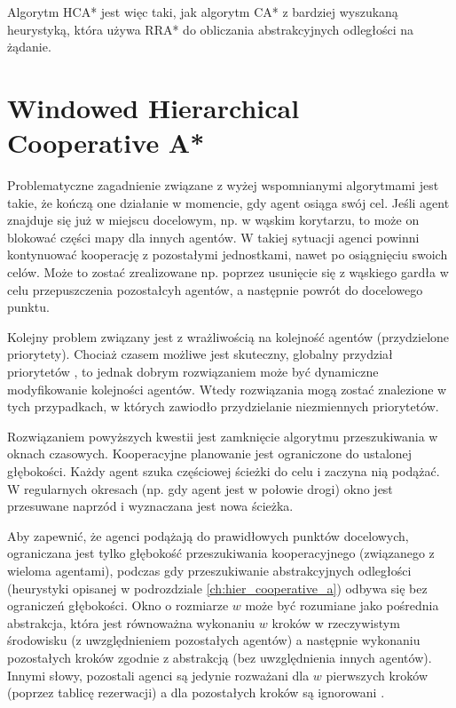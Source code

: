 Algorytm HCA* jest więc taki, jak algorytm CA* z bardziej wyszukaną heurystyką, która używa RRA* do obliczania abstrakcyjnych odległości na żądanie.

\section{Windowed Hierarchical Cooperative A*}
\label{ch:whca}
Problematyczne zagadnienie związane z wyżej wspomnianymi algorytmami jest takie, że kończą one działanie w momencie, gdy agent osiąga swój cel. Jeśli agent znajduje się już w miejscu docelowym, np. w wąskim korytarzu, to może on blokować części mapy dla innych agentów. W takiej sytuacji agenci powinni kontynuować kooperację z pozostałymi jednostkami, nawet po osiągnięciu swoich celów. Może to zostać zrealizowane np. poprzez usunięcie się z wąskiego gardła w celu przepuszczenia pozostałcyh agentów, a następnie powrót do docelowego punktu. \cite{cooppath}

Kolejny problem związany jest z wrażliwością na kolejność agentów (przydzielone priorytety). Chociaż czasem możliwe jest skuteczny, globalny przydział priorytetów \cite{latombe}, to jednak dobrym rozwiązaniem może być dynamiczne modyfikowanie kolejności agentów. Wtedy rozwiązania mogą zostać znalezione w tych przypadkach, w których zawiodło przydzielanie niezmiennych priorytetów. \cite{cooppath}

Rozwiązaniem powyższych kwestii jest zamknięcie algorytmu przeszukiwania w oknach czasowych.
Kooperacyjne planowanie jest ograniczone do ustalonej głębokości. Każdy agent szuka częściowej ścieżki do celu i zaczyna nią podążać. W regularnych okresach (np. gdy agent jest w połowie drogi) okno jest przesuwane naprzód i wyznaczana jest nowa ścieżka.

Aby zapewnić, że agenci podążają do prawidłowych punktów docelowych, ograniczana jest tylko głębokość przeszukiwania kooperacyjnego (związanego z wieloma agentami), podczas gdy przeszukiwanie abstrakcyjnych odległości (heurystyki opisanej w podrozdziale \ref{ch:hier_cooperative_a}) odbywa się bez ograniczeń głębokości. Okno o rozmiarze $w$ może być rozumiane jako pośrednia abstrakcja, która jest równoważna wykonaniu $w$ kroków w rzeczywistym środowisku (z uwzględnieniem pozostałych agentów) a następnie wykonaniu pozostałych kroków zgodnie z abstrakcją (bez uwzględnienia innych agentów). Innymi słowy, pozostali agenci są jedynie rozważani dla $w$ pierwszych kroków (poprzez tablicę rezerwacji) a dla pozostałych kroków są ignorowani \cite{cooppath}.

